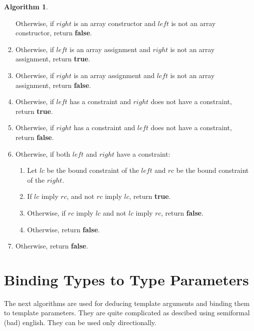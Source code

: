 \documentclass[a4paper,oneside,11pt]{book}
\theoremstyle{definition}
\newtheorem{algo}{Algorithm}[section]
\begin{document}
\begin{algo}
\begin{enumerate}
Otherwise, if $right$ is an array constructor and $left$ is not an array constructor, return \textbf{false}.
\item
Otherwise, if $left$ is an array assignment and $right$ is not an array assignment, return \textbf{true}.
\item
Otherwise, if $right$ is an array assignment and $left$ is not an array assignment, return \textbf{false}.
\item
Otherwise, if $left$ has a constraint and $right$ does not have a constraint, return \textbf{true}.
\item
Otherwise, if $right$ has a constraint and $left$ does not have a constraint, return \textbf{false}.
\item
Otherwise, if both $left$ and $right$ have a constraint:
\begin{enumerate}
\item
Let $lc$ be the bound constraint of the $left$ and $rc$ be the bound constraint of the $right$.
\item
If $lc$ imply $rc$, and not $rc$ imply $lc$, return \textbf{true}.
\item
Otherwise, if $rc$ imply $lc$ and not $lc$ imply $rc$, return \textbf{false}.
\item
Otherwise, return \textbf{false}.
\end{enumerate}
\item
Otherwise, return \textbf{false}.
\end{enumerate}
\end{algo}

\section{Binding Types to Type Parameters}

The next algorithms are used for deducing template arguments and binding them to template parameters.
They are quite complicated as descibed using semiformal (bad) english. They can be used only directionally.
\end{document}
